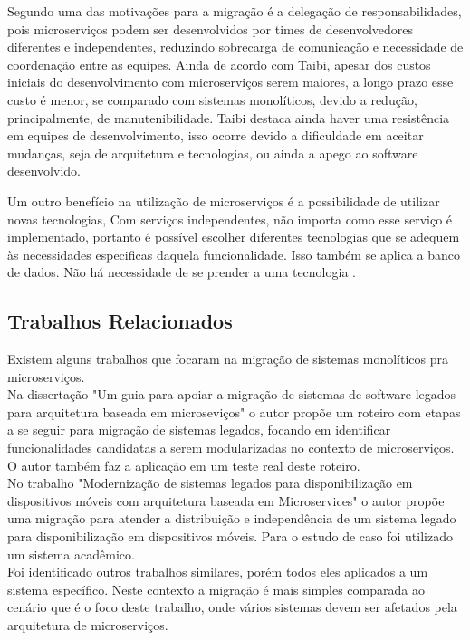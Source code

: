 \documentclass[12pt]{article}
\begin{document}
Segundo \cite{Taibi} uma das motivações para a migração é a delegação de responsabilidades, pois microserviços podem ser desenvolvidos por times de desenvolvedores diferentes e independentes, reduzindo sobrecarga de comunicação e necessidade de coordenação entre as equipes. Ainda de acordo com Taibi, apesar dos custos iniciais do desenvolvimento com microserviços serem maiores, a longo prazo esse custo é menor, se comparado com sistemas monolíticos, devido a redução, principalmente, de manutenibilidade. Taibi destaca ainda haver uma resistência em equipes de desenvolvimento, isso ocorre devido a dificuldade em aceitar mudanças, seja de arquitetura e tecnologias, ou ainda a apego ao software desenvolvido.

Um outro benefício na utilização de microserviços é a possibilidade de utilizar novas tecnologias, Com serviços independentes, não importa como esse serviço é implementado, portanto é possível escolher diferentes tecnologias que se adequem às necessidades especificas daquela funcionalidade. Isso também se aplica a banco de dados. Não há necessidade de se prender a uma tecnologia \cite{Richter2017a}.


\subsection{Trabalhos Relacionados}
Existem alguns trabalhos que focaram na migração de sistemas monolíticos pra microserviços.
\\Na dissertação "Um guia para apoiar a migração de sistemas de software legados para arquitetura baseada em microseviços"\hspace{0.05cm} o autor propõe um roteiro com etapas a se seguir para migração de sistemas legados, focando em identificar funcionalidades candidatas a serem modularizadas no contexto de microserviços. O autor também faz a aplicação em um teste real deste roteiro.
\\No trabalho "Modernização de sistemas legados para disponibilização em dispositivos móveis com arquitetura baseada em Microservices" o autor propõe uma migração para atender a distribuição e independência de um sistema legado para disponibilização em dispositivos móveis. Para o estudo de caso foi utilizado um sistema acadêmico.
\\Foi identificado outros trabalhos similares, porém todos eles aplicados a um sistema específico. Neste contexto a migração é mais simples comparada ao cenário que é o foco deste trabalho, onde vários sistemas devem ser afetados pela arquitetura de microserviços.
\end{document}
